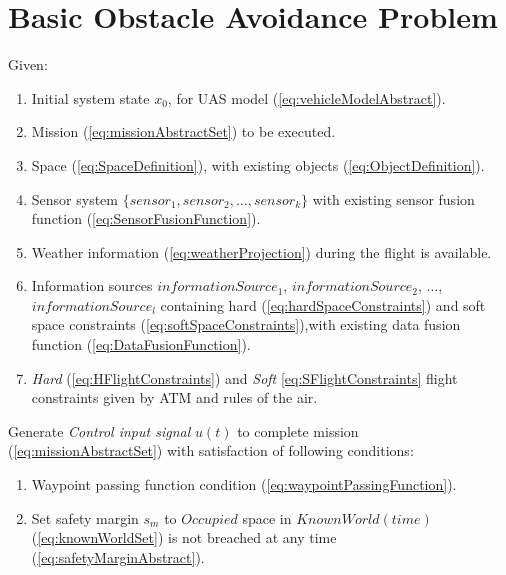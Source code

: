 \section{Basic Obstacle Avoidance Problem}\label{s:BasicProblemDefinition}
    \noindent Given:

    \begin{enumerate}
        \item Initial system state $x_0$, for UAS model (\ref{eq:vehicleModelAbstract}).
        
        \item Mission (\ref{eq:missionAbstractSet}) to be executed.
        
        \item Space (\ref{eq:SpaceDefinition}), with existing objects (\ref{eq:ObjectDefinition}).
        
        \item Sensor system $\{sensor_1, sensor_2,\dots,sensor_k\}$ with existing sensor fusion function (\ref{eq:SensorFusionFunction}).
        
        \item Weather information (\ref{eq:weatherProjection}) during the flight is available.
        
        \item Information sources $informationSource_1$, $informationSource_2$, $\dots$, $informationSource_l$ containing hard (\ref{eq:hardSpaceConstraints}) and soft space constraints (\ref{eq:softSpaceConstraints}),with existing data fusion function (\ref{eq:DataFusionFunction}).
        
        \item \emph{Hard} (\ref{eq:HFlightConstraints}) and \emph{Soft} \ref{eq:SFlightConstraints} flight constraints given by ATM and rules of the air. 
    \end{enumerate}

    \noindent Generate \emph{Control input signal} $u(t)$ to complete mission (\ref{eq:missionAbstractSet}) with satisfaction of following conditions:
    
    \begin{enumerate}
        \item Waypoint passing function condition (\ref{eq:waypointPassingFunction}).
        
        \item Set safety margin $s_m$ to $Occupied$  space in $KnownWorld(time)$ (\ref{eq:knownWorldSet}) is not breached at any time (\ref{eq:safetyMarginAbstract}).
    \end{enumerate}
